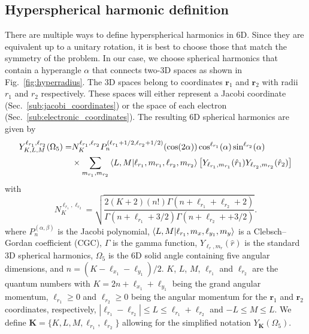 \subsection{Hyperspherical harmonic definition} %
\label{sub:spherical_harmonics}
There are multiple ways to define hyperspherical harmonics in 6D. Since they are equivalent up to a unitary rotation, it is best to choose those that match the symmetry of the problem. In our case, we choose spherical harmonics that contain a hyperangle $\alpha$ that connects two-3D spaces as shown in Fig.~\ref{fig:hyperradius}. The 3D spaces belong to coordinates $\mathbf{r}_1$ and $\mathbf{r}_2$ with radii $r_1$ and $r_2$ respectively. These spaces will either represent a Jacobi coordinate (Sec.~\ref{sub:jacobi_coordinates}) or the space of each electron (Sec.~\ref{sub:electronic_coordinates}). The resulting 6D spherical harmonics are given by
\begin{align}
    Y^{\ell_{r_1},\ell_{r_2}}_{K,L,M}(\Omega_{5}) =& N^{\ell_{r_1},\ell_{r_2}}_K P_n^{(\ell_{r_1}+1/2,\ell_{r_2}+1/2)}(\cos(2\alpha)) \cos^{\ell_{r_1}}(\alpha) \sin^{\ell_{r_2}}(\alpha) \\ 
    &\times\sum_{m_{r_1},m_{r_2}}\bra{L,M}\ket{\ell_{r_1},m_{r_1},\ell_{r_2},m_{r_2}}  \left[Y_{\ell_{r_1},m_{r_1}}(\hat{r}_1) Y_{\ell_{r_2},m_{r_2}}(\hat{r}_2)\right]
\end{align}
with
\begin{equation}
    N^{\ell_{r_1},\ell_{r_2}}_K = \sqrt{\frac{2(K+2)(n!)\Gamma (n+\ell_{r_1}+\ell_{r_2}+2)}{\Gamma (n+\ell_{r_1}+3/2) \Gamma (n+\ell_{r_2}++3/2)}}.
\end{equation}
where $P_n^{(\alpha,\beta)}$ is the Jacobi polynomial,  $\bra{L,M}\ket{\ell_{r_1},m_x,\ell_{y_1},m_y}$ is a Clebsch–Gordan coefficient (CGC), $\Gamma$ is the gamma function, $Y_{\ell_{r},m_{r}}(\hat{r})$ is the standard 3D spherical harmonics, $\Omega_5$ is the 6D solid angle containing five angular dimensions, and $n = (K-\ell_{x_1}-\ell_{y_1})/2$. $K$, $L$, $M$, $\ell_{r_1}$ and $\ell_{r_2}$ are the quantum numbers with $K=2n+\ell_{x_1}+\ell_{y_1}$ being the grand angular momentum, $\ell_{r_1}\ge0$ and $\ell_{r_2}\ge0$ being the angular momentum for the $\mathbf{r}_1$ and $\mathbf{r}_2$ coordinates, respectively, $|\ell_{r_1}-\ell_{r_2}|\le L \le \ell_{r_1}+\ell_{r_2}$ and $-L \le M \le L$. We define $\mathbf{K}=\{K, L, M, \ell_{r_1}, \ell_{r_2}\}$ allowing for the simplified notation $Y_{\mathbf{K}}(\Omega_{5})$.

